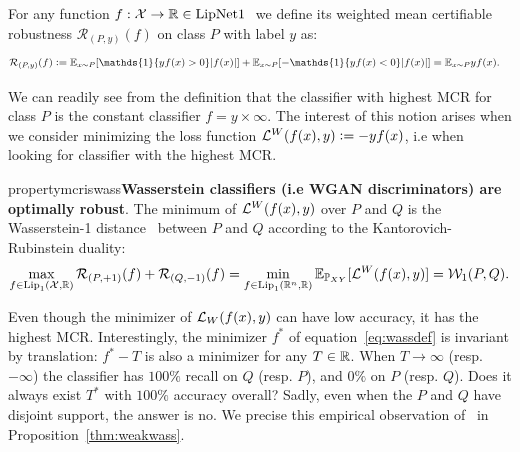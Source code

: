     \begin{definition}\label{def:meancertifiable}
        For any function $f:\mathcal{X}\rightarrow\mathbb{R}\in\text{LipNet1 }$ we define its weighted mean certifiable robustness $\mathcal{R}_{(P,y)}(f)$ on class $P$ with label $y$ as:  
        \begin{equation}
            \begin{aligned}
                \mathcal{R}_{(P,y)}(f)&\defeq\Expect_{x\sim P}[{\mathds{1}\{yf(x)>0\}|f(x)|}]+\Expect_{x\sim P}[{-\mathds{1}\{yf(x)<0\}|f(x)|}]=\Expect_{x\sim P}{yf(x)}.
            \end{aligned}
        \end{equation} 
    \end{definition}  %
      
    We can readily see from the definition that the classifier with highest MCR for class $P$ is the constant classifier $f=y\times\infty$. The interest of this notion arises when we consider minimizing the loss function $\mathcal{L}^{W}(f(x),y)\vcentcolon=-yf(x)$, i.e when looking for classifier with the highest MCR.   
      
    \begin{restatable}{property}{mcriswass}{\normalfont\textbf{Wasserstein classifiers (i.e WGAN discriminators) are optimally robust}.}\label{thm:mcriswass}
        The minimum of $\mathcal{L}^{W}(f(x),y)$ over $P$ and $Q$ is the Wasserstein-1 distance~\cite{villani2008optimal} between $P$ and $Q$ according to the Kantorovich-Rubinstein duality:
        \begin{equation}\label{eq:wassdef}
            \max_{f\in\text{Lip}_1(\mathcal{X},\mathbb{R})}\mathcal{R}_{(P,+1)}(f)+\mathcal{R}_{(Q,-1)}(f)=\min_{f\in\text{Lip}_1(\mathbb{R}^n,\mathbb{R})}\mathbb{E}_{\mathbb{P}_{XY}}[\mathcal{L}^{W}(f(x),y)]=\mathcal{W}_1(P,Q).
        \end{equation}
    \end{restatable}  %
    
    Even though the minimizer of $\mathcal{L}_{W}(f(x),y)$ can have low accuracy, it has the highest MCR. Interestingly, the minimizer $f^{*}$ of equation~\ref{eq:wassdef} is invariant by translation: $f^{*}-T$ is also a minimizer for any $T\in\mathbb{R}$. When $T\rightarrow\infty$ (resp. $-\infty$) the classifier has $100\%$ recall on $Q$ (resp. $P$), and $0\%$ on $P$ (resp. $Q$). Does it always exist $T^{*}$ with $100\%$ accuracy overall? Sadly, even when the $P$ and $Q$ have disjoint support, the answer is no. We precise this empirical observation of~\cite{serrurier2020achieving} in Proposition~\ref{thm:weakwass}.
      
